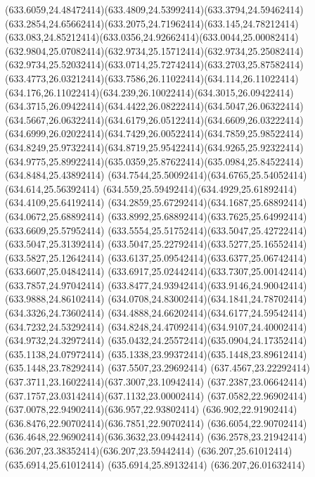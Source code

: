 {{	\curveto(633.6059,24.48472414)(633.4809,24.53992414)(633.3794,24.59462414)
	\curveto(633.2854,24.65662414)(633.2075,24.71962414)(633.145,24.78212414)
	\curveto(633.083,24.85212414)(633.0356,24.92662414)(633.0044,25.00082414)
	\curveto(632.9804,25.07082414)(632.9734,25.15712414)(632.9734,25.25082414)
	\curveto(632.9734,25.52032414)(633.0714,25.72742414)(633.2703,25.87582414)
	\curveto(633.4773,26.03212414)(633.7586,26.11022414)(634.114,26.11022414)
	\curveto(634.176,26.11022414)(634.239,26.10022414)(634.3015,26.09422414)
	\curveto(634.3715,26.09422414)(634.4422,26.08222414)(634.5047,26.06322414)
	\curveto(634.5667,26.06322414)(634.6179,26.05122414)(634.6609,26.03222414)
	\curveto(634.6999,26.02022414)(634.7429,26.00522414)(634.7859,25.98522414)
	\curveto(634.8249,25.97322414)(634.8719,25.95422414)(634.9265,25.92322414)
	\curveto(634.9775,25.89922414)(635.0359,25.87622414)(635.0984,25.84522414)
	\lineto(634.8484,25.43892414)
	\curveto(634.7544,25.50092414)(634.6765,25.54052414)(634.614,25.56392414)
	\curveto(634.559,25.59492414)(634.4929,25.61892414)(634.4109,25.64192414)
	\curveto(634.2859,25.67292414)(634.1687,25.68892414)(634.0672,25.68892414)
	\curveto(633.8992,25.68892414)(633.7625,25.64992414)(633.6609,25.57952414)
	\curveto(633.5554,25.51752414)(633.5047,25.42722414)(633.5047,25.31392414)
	\curveto(633.5047,25.22792414)(633.5277,25.16552414)(633.5827,25.12642414)
	\curveto(633.6137,25.09542414)(633.6377,25.06742414)(633.6607,25.04842414)
	\curveto(633.6917,25.02442414)(633.7307,25.00142414)(633.7857,24.97042414)
	\curveto(633.8477,24.93942414)(633.9146,24.90042414)(633.9888,24.86102414)
	\curveto(634.0708,24.83002414)(634.1841,24.78702414)(634.3326,24.73602414)
	\curveto(634.4888,24.66202414)(634.6177,24.59542414)(634.7232,24.53292414)
	\curveto(634.8248,24.47092414)(634.9107,24.40002414)(634.9732,24.32972414)
	\curveto(635.0432,24.25572414)(635.0904,24.17352414)(635.1138,24.07972414)
	\curveto(635.1338,23.99372414)(635.1448,23.89612414)(635.1448,23.78292414)
	\closepath
	\moveto(637.5507,23.29692414)
	\curveto(637.4567,23.22292414)(637.3711,23.16022414)(637.3007,23.10942414)
	\curveto(637.2387,23.06642414)(637.1757,23.03142414)(637.1132,23.00002414)
	\curveto(637.0582,22.96902414)(637.0078,22.94902414)(636.957,22.93802414)
	\curveto(636.902,22.91902414)(636.8476,22.90702414)(636.7851,22.90702414)
	\curveto(636.6054,22.90702414)(636.4648,22.96902414)(636.3632,23.09442414)
	\curveto(636.2578,23.21942414)(636.207,23.38352414)(636.207,23.59442414)
	\lineto(636.207,25.61012414)
	\lineto(635.6914,25.61012414)
	\lineto(635.6914,25.89132414)
	\lineto(636.207,26.01632414)
}}
